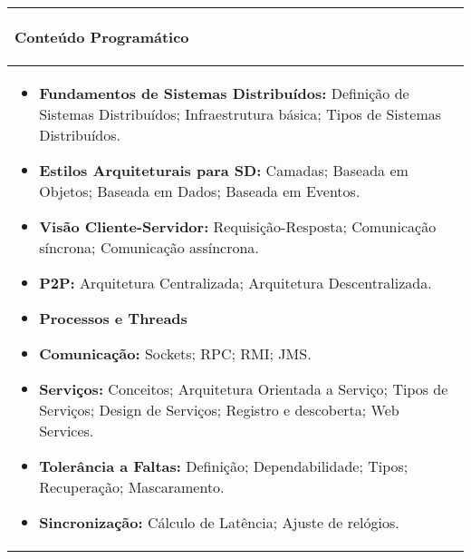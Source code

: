 \hspace{1cm}
\begin{table}[h!]
\centering

\begin{small} 
  
\setlength{\tabcolsep}{3pt} 
\begin{tabular}{|p{15cm}|}\hline

\begin{center}\textbf{Conteúdo Programático}\end{center}\\ \hline
\begin{itemize}
 \item \textbf{Fundamentos de Sistemas Distribuídos:} Definição de Sistemas Distribuídos; Infraestrutura básica; Tipos de Sistemas Distribuídos.

 \item \textbf{Estilos Arquiteturais para SD:} Camadas; Baseada em Objetos; Baseada em Dados; Baseada em Eventos.

 \item \textbf{Visão Cliente-Servidor:} Requisição-Resposta; Comunicação síncrona; Comunicação assíncrona.

 \item \textbf{P2P:} Arquitetura Centralizada; Arquitetura Descentralizada.
 \item \textbf{Processos e Threads}
 \item \textbf{Comunicação:} Sockets; RPC; RMI; JMS.

 \item \textbf{Serviços:} Conceitos; Arquitetura Orientada a Serviço; Tipos de Serviços; Design de Serviços; Registro e descoberta; Web Services.

 \item \textbf{Tolerância a Faltas:} Definição; Dependabilidade; Tipos; Recuperação; Mascaramento.
 \item \textbf{Sincronização:} Cálculo de Latência; Ajuste de relógios.
\end{itemize}
 \\ \hline
\end{tabular} 
\end{small}
\label{dadosinstituicao}
\end{table}

